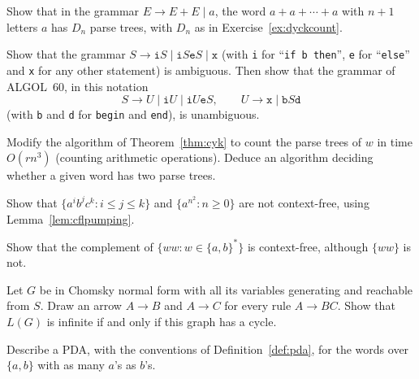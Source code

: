 \begin{exercise}[$\star$]\label{ex:catalanparse}
Show that in the grammar $E\to E+E\mid a$, the word $a+a+\cdots+a$ with $n+1$ letters $a$ has $D_n$ parse trees, with $D_n$ as in Exercise~\ref{ex:dyckcount}.
\end{exercise}

\begin{exercise}[$\star\star$]\label{ex:dangling}
Show that the grammar $S\to\texttt{i}S\mid\texttt{i}S\texttt{e}S\mid\texttt x$ (with \texttt i for ``\texttt{if b then}'', \texttt e for ``\texttt{else}'' and \texttt x for any other statement) is ambiguous. Then show that the grammar of ALGOL~60, in this notation
\[
S\to U\mid\texttt iU\mid\texttt iU\texttt eS,\qquad U\to\texttt x\mid\texttt bS\texttt d
\]
(with \texttt b and \texttt d for \texttt{begin} and \texttt{end}), is unambiguous.
\end{exercise}

\begin{exercise}[$\star$]\label{ex:cykcount}
Modify the algorithm of Theorem~\ref{thm:cyk} to count the parse trees of $w$ in time $O(rn^3)$ (counting arithmetic operations). Deduce an algorithm deciding whether a given word has two parse trees.
\end{exercise}

\begin{exercise}[$\star$]\label{ex:noncfmore}
Show that $\{a^ib^jc^k:i\le j\le k\}$ and $\{a^{n^2}:n\ge0\}$ are not context-free, using Lemma~\ref{lem:cflpumping}.
\end{exercise}

\begin{exercise}[$\star\star\star$]\label{ex:complementww}
Show that the complement of $\{ww:w\in\{a,b\}^*\}$ is context-free, although $\{ww\}$ is not.
\end{exercise}

\begin{exercise}[$\star\star$]\label{ex:finite}
Let $G$ be in Chomsky normal form with all its variables generating and reachable from $S$. Draw an arrow $A\to B$ and $A\to C$ for every rule $A\to BC$. Show that $L(G)$ is infinite if and only if this graph has a cycle.
\end{exercise}

\begin{exercise}[$\star$]\label{ex:pdaanbn}
Describe a PDA, with the conventions of Definition~\ref{def:pda}, for the words over $\{a,b\}$ with as many $a$'s as $b$'s.
\end{exercise}

